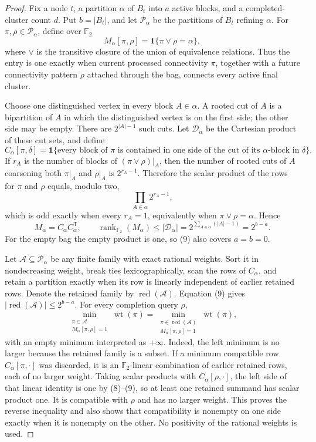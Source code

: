 \documentclass{article}
\begin{document}
\begin{proof}
Fix a node \(t\), a partition \(\alpha\) of \(B_t\) into \(a\) active blocks, and a completed-cluster count \(d\).  Put \(b=|B_t|\), and let \(\mathscr P_\alpha\) be the partitions of \(B_t\) refining \(\alpha\).  For \(\pi,\rho\in\mathscr P_\alpha\), define over \(\mathbb F_2\)
\[
 M_\alpha[\pi,\rho]
 =\mathbf 1\{\pi\vee\rho=\alpha\},
\tag{8}
\]
where \(\vee\) is the transitive closure of the union of equivalence relations.  Thus the entry is one exactly when current processed connectivity \(\pi\), together with a future connectivity pattern \(\rho\) attached through the bag, connects every active final cluster.

Choose one distinguished vertex in every block \(A\in\alpha\).  A rooted cut of \(A\) is a bipartition of \(A\) in which the distinguished vertex is on the first side; the other side may be empty.  There are \(2^{|A|-1}\) such cuts.  Let \(\mathscr D_\alpha\) be the Cartesian product of these cut sets, and define
\[
 C_\alpha[\pi,\delta]
 =\mathbf 1\{\text{every block of \(\pi\) is contained in one side
 of the cut of its \(\alpha\)-block in \(\delta\)}\}.
\]
If \(r_A\) is the number of blocks of \((\pi\vee\rho)|_A\), then the number of rooted cuts of \(A\) coarsening both \(\pi|_A\) and \(\rho|_A\) is \(2^{r_A-1}\).  Therefore the scalar product of the rows for \(\pi\) and \(\rho\) equals, modulo two,
\[
 \prod_{A\in\alpha}2^{r_A-1},
\]
which is odd exactly when every \(r_A=1\), equivalently when \(\pi\vee\rho=\alpha\).  Hence
\[
 M_\alpha=C_\alpha C_\alpha^{\mathsf T},
 \qquad
 \operatorname{rank}_{\mathbb F_2}(M_\alpha)
 \le |\mathscr D_\alpha|
 =2^{\sum_{A\in\alpha}(|A|-1)}=2^{b-a}.
\tag{9}
\]
For the empty bag the empty product is one, so (9) also covers \(a=b=0\).

Let \(\mathscr A\subseteq\mathscr P_\alpha\) be any finite family with exact rational weights.  Sort it in nondecreasing weight, break ties lexicographically, scan the rows of \(C_\alpha\), and retain a partition exactly when its row is linearly independent of earlier retained rows.  Denote the retained family by \(\operatorname{red}(\mathscr A)\).  Equation (9) gives \(|\operatorname{red}(\mathscr A)|\le2^{b-a}\).  For every completion query \(\rho\),
\[
 \min_{\substack{\pi\in\mathscr A\\M_\alpha[\pi,\rho]=1}}
 \operatorname{wt}(\pi)
 =
 \min_{\substack{\pi\in\operatorname{red}(\mathscr A)\\
                   M_\alpha[\pi,\rho]=1}}
 \operatorname{wt}(\pi),
\tag{10}
\]
with an empty minimum interpreted as \(+\infty\).  Indeed, the left minimum is no larger because the retained family is a subset.  If a minimum compatible row \(C_\alpha[\pi,\cdot]\) was discarded, it is an \(\mathbb F_2\)-linear combination of earlier retained rows, each of no larger weight.  Taking scalar products with \(C_\alpha[\rho,\cdot]\), the left side of that linear identity is one by (8)--(9), so at least one retained summand has scalar product one.  It is compatible with \(\rho\) and has no larger weight.  This proves the reverse inequality and also shows that compatibility is nonempty on one side exactly when it is nonempty on the other.  No positivity of the rational weights is used.


\end{proof}
\end{document}
